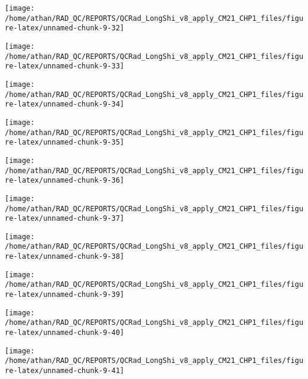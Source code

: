 \documentclass[
  10pt,
  a4paper,oneside]{article}
\begin{document}
\begin{center}\texttt{[image: /home/athan/RAD\_QC/REPORTS/QCRad\_LongShi\_v8\_apply\_CM21\_CHP1\_files/figure-latex/unnamed-chunk-9-32]} \end{center}

\begin{center}\texttt{[image: /home/athan/RAD\_QC/REPORTS/QCRad\_LongShi\_v8\_apply\_CM21\_CHP1\_files/figure-latex/unnamed-chunk-9-33]} \end{center}

\begin{center}\texttt{[image: /home/athan/RAD\_QC/REPORTS/QCRad\_LongShi\_v8\_apply\_CM21\_CHP1\_files/figure-latex/unnamed-chunk-9-34]} \end{center}

\begin{center}\texttt{[image: /home/athan/RAD\_QC/REPORTS/QCRad\_LongShi\_v8\_apply\_CM21\_CHP1\_files/figure-latex/unnamed-chunk-9-35]} \end{center}

\begin{center}\texttt{[image: /home/athan/RAD\_QC/REPORTS/QCRad\_LongShi\_v8\_apply\_CM21\_CHP1\_files/figure-latex/unnamed-chunk-9-36]} \end{center}

\begin{center}\texttt{[image: /home/athan/RAD\_QC/REPORTS/QCRad\_LongShi\_v8\_apply\_CM21\_CHP1\_files/figure-latex/unnamed-chunk-9-37]} \end{center}

\begin{center}\texttt{[image: /home/athan/RAD\_QC/REPORTS/QCRad\_LongShi\_v8\_apply\_CM21\_CHP1\_files/figure-latex/unnamed-chunk-9-38]} \end{center}

\begin{center}\texttt{[image: /home/athan/RAD\_QC/REPORTS/QCRad\_LongShi\_v8\_apply\_CM21\_CHP1\_files/figure-latex/unnamed-chunk-9-39]} \end{center}

\begin{center}\texttt{[image: /home/athan/RAD\_QC/REPORTS/QCRad\_LongShi\_v8\_apply\_CM21\_CHP1\_files/figure-latex/unnamed-chunk-9-40]} \end{center}

\begin{center}\texttt{[image: /home/athan/RAD\_QC/REPORTS/QCRad\_LongShi\_v8\_apply\_CM21\_CHP1\_files/figure-latex/unnamed-chunk-9-41]} \end{center}
\end{document}
